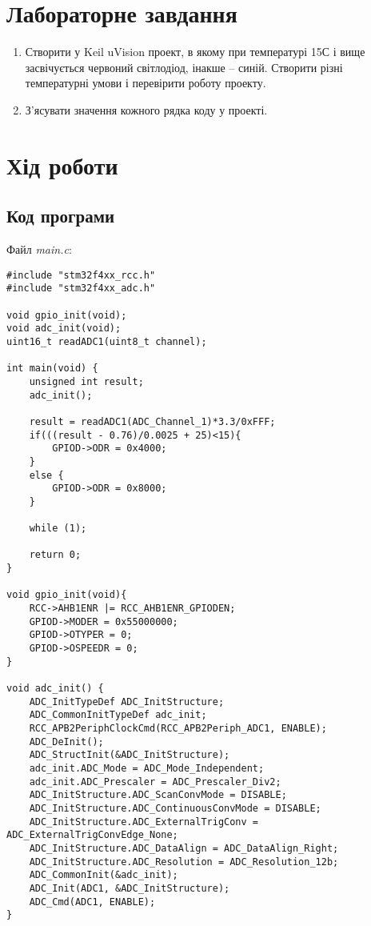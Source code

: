 \documentclass[oneside,14pt]{extarticle}
\begin{document}
\begin{normalsize}
    \section*{Лабораторне завдання}
    \begin{enumerate}
        \item Створити у Keil uVision проект, в якому при температурі 15С і вище засвічується червоний світлодіод, інакше – синій. Створити різні температурні умови і перевірити роботу проекту.
        \item З’ясувати значення кожного рядка коду у проекті. 
    \end{enumerate}

	\section*{Хід роботи}
	
	\subsection*{Код програми}
	Файл \textit{main.c}:
	{\small
		\begin{lstlisting}
#include "stm32f4xx_rcc.h"
#include "stm32f4xx_adc.h"

void gpio_init(void);
void adc_init(void); 
uint16_t readADC1(uint8_t channel); 

int main(void) {
	unsigned int result; 
	adc_init(); 
	
	result = readADC1(ADC_Channel_1)*3.3/0xFFF; 
	if(((result - 0.76)/0.0025 + 25)<15){ 
		GPIOD->ODR = 0x4000; 
	} 
	else { 
		GPIOD->ODR = 0x8000; 
	} 
		
	while (1); 
		
	return 0;
}

void gpio_init(void){ 
	RCC->AHB1ENR |= RCC_AHB1ENR_GPIODEN; 
	GPIOD->MODER = 0x55000000; 
	GPIOD->OTYPER = 0;
	GPIOD->OSPEEDR = 0; 
}

void adc_init() { 
	ADC_InitTypeDef ADC_InitStructure; 
	ADC_CommonInitTypeDef adc_init; 
	RCC_APB2PeriphClockCmd(RCC_APB2Periph_ADC1, ENABLE); 
	ADC_DeInit(); 
	ADC_StructInit(&ADC_InitStructure); 
	adc_init.ADC_Mode = ADC_Mode_Independent; 
	adc_init.ADC_Prescaler = ADC_Prescaler_Div2; 
	ADC_InitStructure.ADC_ScanConvMode = DISABLE; 
	ADC_InitStructure.ADC_ContinuousConvMode = DISABLE; 
	ADC_InitStructure.ADC_ExternalTrigConv = ADC_ExternalTrigConvEdge_None;
	ADC_InitStructure.ADC_DataAlign = ADC_DataAlign_Right; 
	ADC_InitStructure.ADC_Resolution = ADC_Resolution_12b; 
	ADC_CommonInit(&adc_init); 
	ADC_Init(ADC1, &ADC_InitStructure); 
	ADC_Cmd(ADC1, ENABLE); 
} 


\end{lstlisting}}
\end{normalsize}
\end{document}
